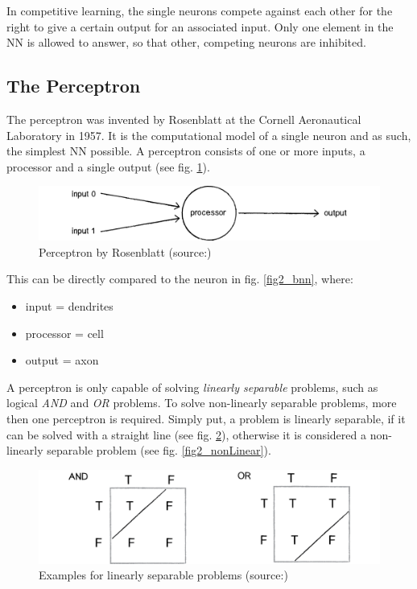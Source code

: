 In competitive learning, the single neurons compete against each other for the right to give a certain output for an associated input. Only one element in the NN is allowed to answer, so that other, competing neurons are inhibited\cite{Rojas96}.


\subsection{The Perceptron}
The perceptron was invented by Rosenblatt at the Cornell Aeronautical Laboratory in 1957\cite{Rosenblatt58}. It is the computational model of a single neuron and as such, the simplest NN possible\cite{Shiffman12}. A perceptron consists of one or more inputs, a processor and a single output (see fig. \ref{fig2_pereptron})\cite{Rosenblatt58}.

\begin{figure}[H]
	\begin{center}
		\includegraphics[scale=0.7]{img/perceptron.png}
		\caption{Perceptron by Rosenblatt (source:\cite{Shiffman12})}
		\label{fig2_pereptron}
	\end{center}
\end{figure}

This can be directly compared to the neuron in fig. \ref{fig2_bnn}, where:
\begin{itemize}
	\item input = dendrites
	\item processor = cell
	\item output = axon
\end{itemize}

A perceptron is only capable of solving \emph{linearly separable} problems, such as logical \emph{AND} and \emph{OR} problems. To solve non-linearly separable problems, more then one perceptron is required\cite{Rosenblatt58}. Simply put, a problem is linearly separable, if it can be solved with a straight line (see fig. \ref{fig2_linear}), otherwise it is considered a non-linearly separable problem (see fig. \ref{fig2_nonLinear}).

\begin{figure}[H]
	\begin{center}
		\includegraphics[scale=0.6]{img/lsp.png}
		\caption{Examples for linearly separable problems (source:\cite{Shiffman12})}
		\label{fig2_linear}
	\end{center}
\end{figure}

